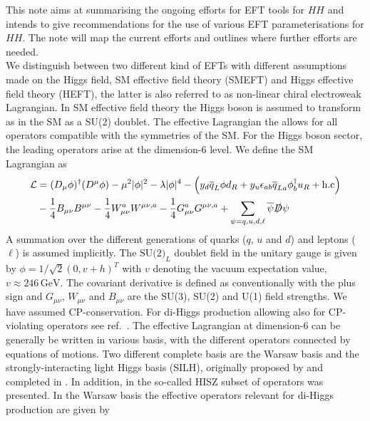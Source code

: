 This note aims at summarising the ongoing efforts for EFT tools for $HH$ and intends to give recommendations for the use of various EFT parameterisations for $HH$. The note will map the current efforts and outlines where further efforts are needed.
\\
We distinguish between two different kind of EFTs with different assumptions made on the Higgs field, SM effective field theory (SMEFT) and Higgs effective field theory (HEFT), the latter is also referred to as non-linear chiral electroweak Lagrangian. In SM effective field theory the Higgs boson is assumed to transform as in the SM as a SU(2) doublet. The effective Lagrangian the allows for all operators compatible with the symmetries of the SM. For the Higgs boson sector, the leading operators arise at the dimension-6 level. 
We define the SM Lagrangian as 
\begin{equation}
	\begin{split}
		\mathcal{L}&=(D_{\mu} \phi)^{\dagger} (D^{\mu}\phi)-\mu^2 |\phi|^2-\lambda |\phi|^4-\left(y_d \bar{q}_L \phi d_R+y_u  \epsilon_{ab}\bar{q}_{La} \phi^{\dagger}_b u_R +\text{h.c}\right)\\
		& - \frac{1}{4}B_{\mu\nu}B^{\mu\nu}- \frac{1}{4}W_{\mu\nu}^a W^{\mu\nu,a} -\frac{1}{4}G_{\mu\nu}^aG^{\mu\nu,a}+\sum_{\psi=q,u,d,\ell}\bar{\psi}\slashed{D}\psi
	\end{split}
\end{equation}
A summation over the different generations of quarks ($q$, $u$ and $d$) and leptons ($\ell$) is assumed implicitly. The $\text{SU(2)}_L$ doublet field in the unitary gauge is given by $\phi=1/\sqrt{2}(0,v+h)^T$ with $v$ denoting the vacuum expectation value, $v\approx 246\,\text{GeV}$. The covariant derivative is defined as conventionally with the plus sign and $G_{\mu\nu}$, $W_{\mu\nu}$ and $B_{\mu\nu}$ are the SU(3), SU(2) and U(1) field strengths. We have assumed CP-conservation. For di-Higgs production allowing also for CP-violating operators see ref.~\cite{Grober:2017gut}.
The effective Lagrangian at dimension-6 can be generally be written in various basis, with the different operators connected by equations of motions. Two different complete basis are the Warsaw basis \cite{Grzadkowski:2010es} and the strongly-interacting light Higgs basis (SILH), originally proposed by \cite{Giudice:2007fh} and completed in \cite{Contino:2013kra, Elias-Miro:2013eta}. In addition, in \cite{Hagiwara:1993ck} the so-called HISZ subset of operators was presented.
In the Warsaw basis the effective operators relevant for di-Higgs production are given by 
